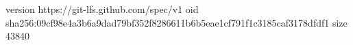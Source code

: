 version https://git-lfs.github.com/spec/v1
oid sha256:09cf98e4a3b6a9dad79bf352f8286611b6b5eae1cf791f1c3185caf3178dfdf1
size 43840

